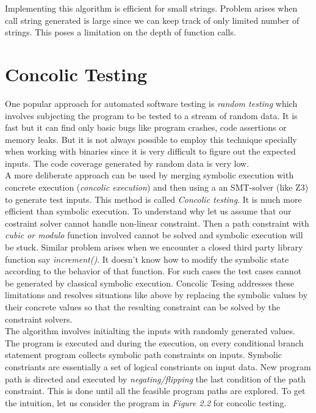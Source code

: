 \documentclass[12pt,oneside]{book}
\begin{document}
Implementing this algorithm is efficient for small strings. Problem arises when call string generated is large since we can keep track of only limited number of strings. This poses a limitation on the depth of function calls.



\section {Concolic Testing}

One popular approach for automated software testing is \textit{random testing} which involves subjecting the program to be tested to a stream of random data. It is fast but it can find only basic bugs like program crashes, code assertions or memory leaks. But it is not always possible to employ this technique specially when working with binaries since it is very difficult to figure out the expected inputs. The code coverage generated by random data is very low.\\

A more deliberate approach can be used by merging symbolic execution with concrete execution (\textit{concolic execution}) and then using a an SMT-solver (like Z3) to generate test inputs. This method is called \textit{Concolic testing}. It is much more efficient than symbolic execution. To understand why let us assume that our costraint solver cannot handle non-linear constraint. Then a path constraint with \textit{cubic or modulo} function involved cannot be solved and symbolic execution will be stuck. Similar problem arises when we encounter a closed third party library function say \textit{increment()}. It doesn't know how to modify the symbolic state according to the behavior of that function. For such cases the test cases cannot be generated by classical symbolic execution. Concolic Tesing addresses these limitations and resolves situations like above by replacing the symbolic values by their concrete values so that the resulting constraint can be solved by the constraint solvers.\\

The algorithm involves initialting the inputs with randomly generated values. The program is executed and during the execution, on every conditional branch statement program collects symbolic path constraints on inputs. Symbolic constriants are essentially a set of logical constriants on input data. New program path is directed and executed by \textit{negating/flipping} the last condition of the path constraint. This is done until all the feasible program paths are explored. To get the intuition, let us consider the program in \textit{Figure 2.2} for concolic testing.  
\end{document}
